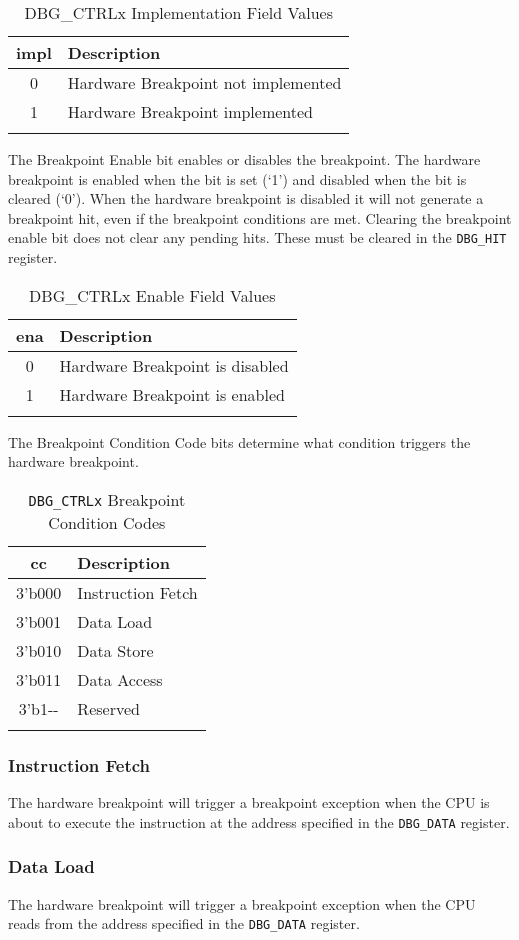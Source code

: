 \begin{longtable}[!htb]{@{}cl@{}}
\toprule
impl & Description\tabularnewline
\midrule
\endhead
0 & Hardware Breakpoint not implemented\tabularnewline
1 & Hardware Breakpoint implemented\tabularnewline
\bottomrule
\caption{DBG\_CTRLx Implementation Field Values}
\end{longtable}


The Breakpoint Enable bit enables or disables the breakpoint. The
hardware breakpoint is enabled when the bit is set (`1') and disabled
when the bit is cleared (`0'). When the hardware breakpoint is disabled
it will not generate a breakpoint hit, even if the breakpoint conditions
are met. Clearing the breakpoint enable bit does not clear any pending
hits. These must be cleared in the \texttt{DBG\_HIT} register.

\begin{longtable}[]{@{}cl@{}}
\toprule
ena & Description\tabularnewline
\midrule
\endhead
0 & Hardware Breakpoint is disabled\tabularnewline
1 & Hardware Breakpoint is enabled\tabularnewline
\bottomrule
\caption{DBG\_CTRLx Enable Field Values}
\end{longtable}


The Breakpoint Condition Code bits determine what condition triggers the
hardware breakpoint.

\begin{longtable}[]{@{}cl@{}}
\toprule
cc & Description\tabularnewline
\midrule
\endhead
3'b000 & Instruction Fetch\tabularnewline
3'b001 & Data Load\tabularnewline
3'b010 & Data Store\tabularnewline
3'b011 & Data Access\tabularnewline
3'b1-\/- & Reserved\tabularnewline
\bottomrule
\caption{\texttt{DBG\_CTRLx} Breakpoint Condition Codes}
\end{longtable}

\subsubsection{Instruction Fetch}\label{instruction-fetch}

The hardware breakpoint will trigger a breakpoint exception when the CPU
is about to execute the instruction at the address specified in the
\texttt{DBG\_DATA} register.

\subsubsection{Data Load}\label{data-load}

The hardware breakpoint will trigger a breakpoint exception when the CPU
reads from the address specified in the \texttt{DBG\_DATA} register.

